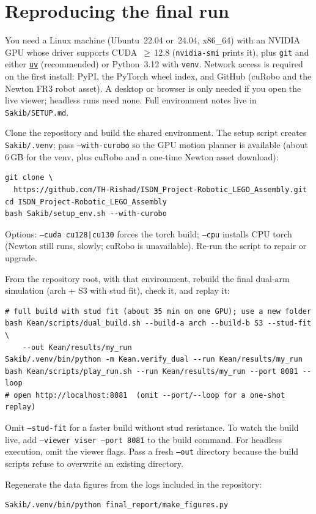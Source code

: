 \documentclass[11pt,a4paper]{article}
\begin{document}
\appendix
\section{Reproducing the final run}
You need a Linux machine (Ubuntu~22.04 or~24.04, x86\_64) with an NVIDIA GPU
whose driver supports CUDA~$\ge$\,12.8 (\texttt{nvidia-smi} prints it), plus
\texttt{git} and either \href{https://docs.astral.sh/uv/}{\texttt{uv}}
(recommended) or Python~3.12 with \texttt{venv}. Network access is required on
the first install: PyPI, the PyTorch wheel index, and GitHub (cuRobo and the
Newton FR3 robot asset). A desktop or browser is only needed if you open the
live viewer; headless runs need none. Full environment notes live in
\texttt{Sakib/SETUP.md}.

Clone the repository and build the shared environment. The setup script creates
\texttt{Sakib/.venv}; pass \texttt{--with-curobo} so the GPU motion planner is
available (about 6\,GB for the venv, plus cuRobo and a one-time Newton asset
download):
\begin{verbatim}
git clone \
  https://github.com/TH-Rishad/ISDN_Project-Robotic_LEGO_Assembly.git
cd ISDN_Project-Robotic_LEGO_Assembly
bash Sakib/setup_env.sh --with-curobo
\end{verbatim}
Options: \texttt{--cuda cu128|cu130} forces the torch build;
\texttt{--cpu} installs CPU torch (Newton still runs, slowly; cuRobo is
unavailable). Re-run the script to repair or upgrade.

From the repository root, with that environment, rebuild the final dual-arm
simulation (arch + S3 with stud fit), check it, and replay it:
\begin{verbatim}
# full build with stud fit (about 35 min on one GPU); use a new folder
bash Kean/scripts/dual_build.sh --build-a arch --build-b S3 --stud-fit \
    --out Kean/results/my_run
Sakib/.venv/bin/python -m Kean.verify_dual --run Kean/results/my_run
bash Kean/scripts/play_run.sh --run Kean/results/my_run --port 8081 --loop
# open http://localhost:8081  (omit --port/--loop for a one-shot replay)
\end{verbatim}
Omit \texttt{--stud-fit} for a faster build without stud resistance. To watch
the build live, add \texttt{--viewer viser --port 8081} to the build command.
For headless execution, omit the viewer flags. Pass a fresh \texttt{--out}
directory because the build scripts refuse to overwrite an existing directory.

Regenerate the data figures from the logs included in the repository:
\begin{verbatim}
Sakib/.venv/bin/python final_report/make_figures.py
\end{verbatim}
\end{document}
